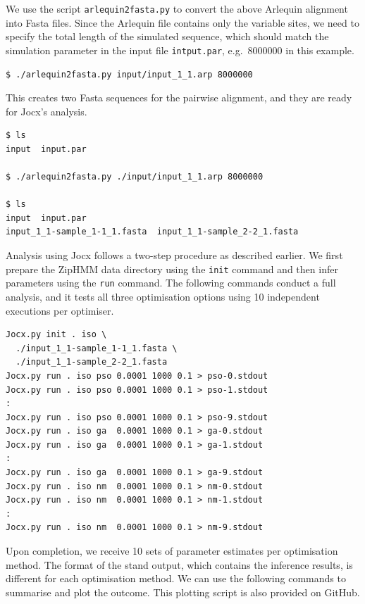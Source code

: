\documentclass[graybox]{svmult}
\begin{document}
We use the script \texttt{arlequin2fasta.py} to convert the above Arlequin alignment into Fasta files.  Since the Arlequin file contains only the variable sites, we need to specify the total length of the simulated sequence, which should match the simulation parameter in the input file \texttt{intput.par}, e.g.\ 8000000 in this example.

 {\scriptsize{}\begin{verbatim}
$ ./arlequin2fasta.py input/input_1_1.arp 8000000
\end{verbatim}}

This creates two Fasta sequences for the pairwise alignment, and they are ready for Jocx's analysis.

 {\scriptsize{}\begin{verbatim}
$ ls
input  input.par

$ ./arlequin2fasta.py ./input/input_1_1.arp 8000000

$ ls
input  input.par
input_1_1-sample_1-1_1.fasta  input_1_1-sample_2-2_1.fasta
\end{verbatim}}

Analysis using Jocx follows a two-step procedure as described earlier.  We first prepare the ZipHMM data directory using the \texttt{init} command and then infer parameters using the \texttt{run} command.  The following commands conduct a full analysis, and it tests all three optimisation options using 10 independent executions per optimiser.

{\scriptsize{}\begin{verbatim}
Jocx.py init . iso \
  ./input_1_1-sample_1-1_1.fasta \
  ./input_1_1-sample_2-2_1.fasta
Jocx.py run . iso pso 0.0001 1000 0.1 > pso-0.stdout
Jocx.py run . iso pso 0.0001 1000 0.1 > pso-1.stdout
:
Jocx.py run . iso pso 0.0001 1000 0.1 > pso-9.stdout
Jocx.py run . iso ga  0.0001 1000 0.1 > ga-0.stdout
Jocx.py run . iso ga  0.0001 1000 0.1 > ga-1.stdout
:
Jocx.py run . iso ga  0.0001 1000 0.1 > ga-9.stdout
Jocx.py run . iso nm  0.0001 1000 0.1 > nm-0.stdout
Jocx.py run . iso nm  0.0001 1000 0.1 > nm-1.stdout
:
Jocx.py run . iso nm  0.0001 1000 0.1 > nm-9.stdout
\end{verbatim}}

Upon completion, we receive 10 sets of parameter estimates per optimisation method.  The format of the stand output, which contains the inference results, is different for each optimisation method.  We can use the following commands to summarise and plot the outcome.  This plotting script is also provided on GitHub.
\end{document}
